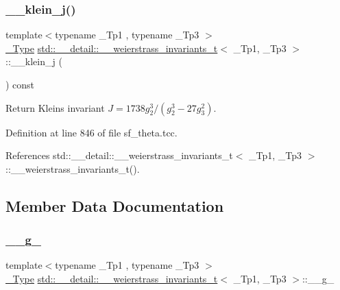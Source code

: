 \subsubsection{\texorpdfstring{\+\_\+\+\_\+klein\+\_\+j()}{\_\_klein\_j()}}
{\footnotesize\ttfamily template$<$typename \+\_\+\+Tp1 , typename \+\_\+\+Tp3 $>$ \\
\hyperlink{structstd_1_1____detail_1_1____weierstrass__invariants__t_a9992ab3f07a514203487c0760d76173f}{\+\_\+\+Type} \hyperlink{structstd_1_1____detail_1_1____weierstrass__invariants__t}{std\+::\+\_\+\+\_\+detail\+::\+\_\+\+\_\+weierstrass\+\_\+invariants\+\_\+t}$<$ \+\_\+\+Tp1, \+\_\+\+Tp3 $>$\+::\+\_\+\+\_\+klein\+\_\+j (\begin{DoxyParamCaption}{ }\end{DoxyParamCaption}) const\hspace{0.3cm}{\ttfamily [inline]}}



Return Klein\textquotesingle{}s invariant $ J = 1738 g_2^3 / (g_2^3 - 27 g_3^2) $. 



Definition at line 846 of file sf\+\_\+theta.\+tcc.



References std\+::\+\_\+\+\_\+detail\+::\+\_\+\+\_\+weierstrass\+\_\+invariants\+\_\+t$<$ \+\_\+\+Tp1, \+\_\+\+Tp3 $>$\+::\+\_\+\+\_\+weierstrass\+\_\+invariants\+\_\+t().



\subsection{Member Data Documentation}
\mbox{\label{structstd_1_1____detail_1_1____weierstrass__invariants__t_aca0be8978b83ec9a892cf9b5b39019ec}} 
\subsubsection{\texorpdfstring{\+\_\+\+\_\+g\+\_}{\_\_g\_2}}
{\footnotesize\ttfamily template$<$typename \+\_\+\+Tp1 , typename \+\_\+\+Tp3 $>$ \\
\hyperlink{structstd_1_1____detail_1_1____weierstrass__invariants__t_a9992ab3f07a514203487c0760d76173f}{\+\_\+\+Type} \hyperlink{structstd_1_1____detail_1_1____weierstrass__invariants__t}{std\+::\+\_\+\+\_\+detail\+::\+\_\+\+\_\+weierstrass\+\_\+invariants\+\_\+t}$<$ \+\_\+\+Tp1, \+\_\+\+Tp3 $>$\+::\+\_\+\+\_\+g\+\_}



